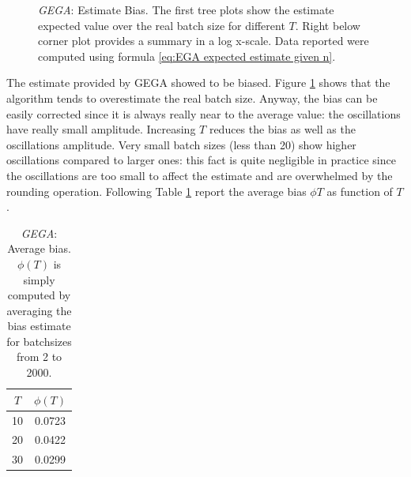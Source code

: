 \documentclass[11pt,a4paper,twoside,openright]{book}
\begin{document}
\begin{figure}[thbp]
\caption[\emph{GEGA}: Estimate Bias]{\emph{GEGA}: Estimate Bias. The first tree plots show the estimate expected value over the real batch size for different $T$. Right below corner plot provides a summary in a log x-scale. Data reported were computed using formula \eqref{eq:EGA expected estimate given n}.}
\label{fg:GEGA-bias}
\end{figure}

The estimate provided by GEGA showed to be biased. Figure \ref{fg:GEGA-bias} shows that the algorithm tends to overestimate the real batch size. Anyway, the bias can be easily corrected since it is always really near to the average value: the oscillations have really small amplitude. Increasing $T$ reduces the bias as well as the oscillations amplitude. Very small batch sizes (less than 20) show higher oscillations compared to larger ones: this fact is quite negligible in practice since the oscillations are too small to affect the estimate and are overwhelmed by the rounding operation.  Following Table \ref{tb:GEGA-average-bias} report the average bias $\phi{T}$ as function of $T$.\\ 

\begin{table}[htdp]
\centering
\begin{tabular}{c|c}
\toprule
$T$ & $\phi(T)$ \\
\midrule
10 & 0.0723  \\
20 & 0.0422  \\
30 & 0.0299\\
\bottomrule
\end{tabular} 
\caption[\emph{GEGA}: Average bias]{\emph{GEGA}: Average bias. $\phi(T)$ is simply computed by averaging the bias estimate for batchsizes from 2 to 2000.}
\label{tb:GEGA-average-bias}
\end{table}
\end{document}
